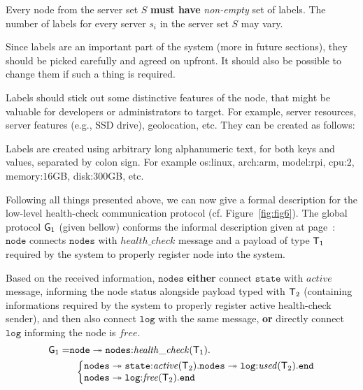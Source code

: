 \begin{definition}
	Every node from the server set $S$ \textbf{must have} \emph{non-empty} set of labels. The number of labels for every server $s_i$ in the server set $S$ may vary.
\end{definition}

\noindent
Since labels are an important part of the system (more in future sections), they should be picked carefully and agreed on upfront. It should also be possible to change them if such a thing is required. 

Labels should stick out some distinctive features of the node, that might be valuable for developers or administrators to target. For example, server resources, server features (e.g., SSD drive), geolocation, etc. They can be created as follows:

\begin{definition}
	Labels are created using arbitrary long alphanumeric text, for both keys and values, separated by colon sign. For example os:linux, arch:arm, model:rpi, cpu:$2$, memory:$16$GB, disk:$300$GB, etc.
\end{definition}

\noindent
Following all things presented above, we can now give a formal description for the low-level health-check communication protocol (cf. Figure~\ref{fig:fig6}). The global protocol ${\sf G}_1$ (given bellow) conforms the informal description given at page~\pageref{informal_description_health-check}: $\mathtt{node}$ connects $\mathtt{nodes}$ with $\mathit{health{\_}check}$ message and a payload of type ${\mathsf T}_1$ required by the system to properly register node into the system. 

Based on the received information, $\mathtt{nodes}$ {\bf either} connect $\mathtt{state}$ with $\mathit{active}$ message, informing the node status alongside payload typed with ${\mathsf T}_2$ (containing informations required by the system to properly register active health-check sender), and then also connect $\mathtt{log}$ with the same message, {\bf or} directly connect $\mathtt{log}$ informing the node is $\mathit{free}$.
\begin{align*}
\G_1 = & 
\mathtt{node} \twoheadrightarrow \mathtt{nodes}{:}\mathit{health{\_}check}(\T_1).\\
& \hspace{2mm}
\left\{
\begin{array}{@{}l@{}}
\mathtt{nodes} \twoheadrightarrow \mathtt{state}{:}\mathit{active}(\T_2).\mathtt{nodes}\twoheadrightarrow \mathtt{log}{:}\mathit{used}(\T_2).\tend\\
\mathtt{nodes}\twoheadrightarrow \mathtt{log}{:}\mathit{free}(\T_2).\tend
\end{array} \right.
\end{align*}

